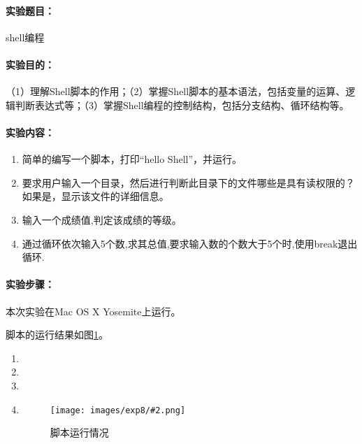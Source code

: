 \documentclass[cs4size,a4paper,nofonts]{ctexart}
\def\titlec{shell编程}
\begin{document}




\paragraph{实验题目：}\titlec

\paragraph{实验目的：}
（1）理解Shell脚本的作用；（2）掌握Shell脚本的基本语法，包括变量的运算、逻辑判断表达式等；（3）掌握Shell编程的控制结构，包括分支结构、循环结构等。

\paragraph{实验内容：}
\begin{enumerate}
\item 简单的编写一个脚本，打印“hello Shell”，并运行。
\item 要求用户输入一个目录，然后进行判断此目录下的文件哪些是具有读权限的？如果是，显示该文件的详细信息。
\item 输入一个成绩值,判定该成绩的等级。
\item 通过循环依次输入5个数,求其总值,要求输入数的个数大于5个时,使用break退出循环. 
\end{enumerate}

\paragraph{实验步骤：}\quad

\newcommand{\image}[3][width=0.9\textwidth]{
    \centering
        \texttt{[image: images/exp8/\#2.png]}
    \caption{#3}
    \label{fig:#3}
}

本次实验在Mac OS X Yosemite上运行。

脚本的运行结果如图\ref{fig:脚本运行情况}。

\begin{enumerate}

\item 

{\linespread{1}}

\item 

{\linespread{1}}

\item 

{\linespread{1}}

\item 

{\linespread{1}}

\begin{figure}[htp]
\image{shell}{脚本运行情况}
\end{figure}

\end{enumerate}
\end{document}
